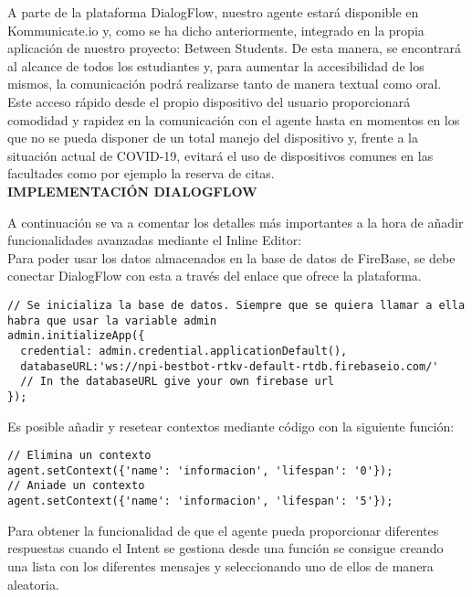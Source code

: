 \documentclass[11pt,a4paper]{article}
\begin{document}
A parte de la plataforma DialogFlow, nuestro agente estará disponible en Kommunicate.io y, como se ha dicho anteriormente, integrado en la propia aplicación de nuestro proyecto: Between Students. De esta manera, se encontrará al alcance de todos los estudiantes y, para aumentar la accesibilidad de los mismos, la comunicación podrá realizarse tanto de manera textual como oral.\\


Este acceso rápido desde el propio dispositivo del usuario proporcionará comodidad y rapidez en la comunicación con el agente hasta en momentos en los que no se pueda disponer de un total manejo del dispositivo y, frente a la situación actual de COVID-19, evitará el uso de dispositivos comunes en las facultades como por ejemplo la reserva de citas.\\

\newpage
\textbf{{\Large IMPLEMENTACIÓN DIALOGFLOW\\}}

A continuación se va a comentar los detalles más importantes a la hora de añadir funcionalidades avanzadas mediante el Inline Editor:\\

Para poder usar los datos almacenados en la base de datos de FireBase, se debe conectar DialogFlow con esta a través del enlace que ofrece la plataforma.\\

\begin{lstlisting}
// Se inicializa la base de datos. Siempre que se quiera llamar a ella habra que usar la variable admin
admin.initializeApp({
  credential: admin.credential.applicationDefault(),
  databaseURL:'ws://npi-bestbot-rtkv-default-rtdb.firebaseio.com/' 
  // In the databaseURL give your own firebase url
});
\end{lstlisting}

Es posible añadir y resetear contextos mediante código con la siguiente función:\\

\begin{lstlisting}
// Elimina un contexto
agent.setContext({'name': 'informacion', 'lifespan': '0'});
// Aniade un contexto
agent.setContext({'name': 'informacion', 'lifespan': '5'});
\end{lstlisting}

Para obtener la funcionalidad de que el agente pueda proporcionar diferentes respuestas cuando el Intent se gestiona desde una función se consigue creando una lista con los diferentes mensajes y seleccionando uno de ellos de manera aleatoria.\\
\end{document}
